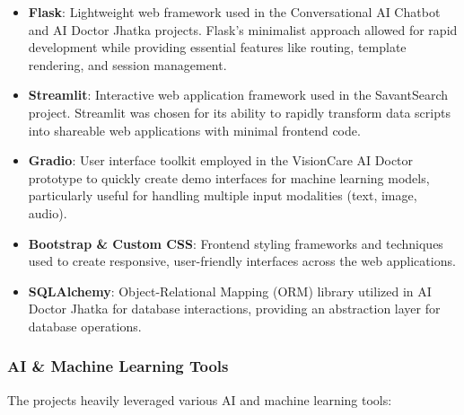 \documentclass[12pt,a4paper]{article}
\begin{document}
\begin{itemize}
    \item \textbf{Flask}: Lightweight web framework used in the Conversational AI Chatbot and AI Doctor Jhatka projects. Flask's minimalist approach allowed for rapid development while providing essential features like routing, template rendering, and session management.
    
    \item \textbf{Streamlit}: Interactive web application framework used in the SavantSearch project. Streamlit was chosen for its ability to rapidly transform data scripts into shareable web applications with minimal frontend code.
    
    \item \textbf{Gradio}: User interface toolkit employed in the VisionCare AI Doctor prototype to quickly create demo interfaces for machine learning models, particularly useful for handling multiple input modalities (text, image, audio).
    
    \item \textbf{Bootstrap \& Custom CSS}: Frontend styling frameworks and techniques used to create responsive, user-friendly interfaces across the web applications.
    
    \item \textbf{SQLAlchemy}: Object-Relational Mapping (ORM) library utilized in AI Doctor Jhatka for database interactions, providing an abstraction layer for database operations.
\end{itemize}

\subsubsection{AI \& Machine Learning Tools}
The projects heavily leveraged various AI and machine learning tools:
\end{document}
